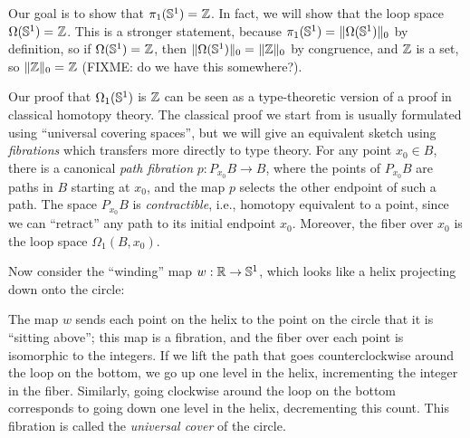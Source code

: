 Our goal is to show that $\id {\pi_1(\Sn ^1)} {\Z}$.  In fact, we
will show that the loop space $\id {\Omega(\Sn ^1)} {\Z}$.  This is a stronger
statement, because $\id{\pi_1(\Sn ^1)} {\trunc 0 {\Omega(\Sn ^1)}}$ by
definition, so if $\id {\Omega(\Sn ^1)} {\Z}$, then $\id {\trunc
  0 {\Omega(\Sn ^1)}} {\trunc 0 {\Z}}$ by congruence, and
$\Z$ is a set, so $\id {\trunc 0 {\Z}} {\Z}$
(FIXME: do we have this somewhere?).  

Our proof that $\Omega_1(\Sn ^1)$ is $\Z$ can be seen as a
type-theoretic version of a proof in classical homotopy theory.  The
classical proof we start from is usually formulated using ``universal
covering spaces'', but we will give an equivalent sketch using
\emph{fibrations} which transfers more directly to type theory.  For any
point $x_0\in B$, there is a canonical \emph{path fibration} $p:P_{x_0}
B \to B$, where the points of $P_{x_0} B$ are paths in $B$ starting at
$x_0$, and the map $p$ selects the other endpoint of such a path.  The
space $P_{x_0} B$ is \emph{contractible}, i.e., homotopy equivalent to a
point, since we can ``retract'' any path to its initial endpoint $x_0$.
Moreover, the fiber over $x_0$ is the loop space $\Omega_1(B,x_0)$.

Now consider the ``winding'' map $w:\mathbb{R}\to \Sn ^1$, which
looks like a helix projecting down onto the circle:
\begin{center}
\end{center}
The map $w$ sends each point on the helix to the point on the circle
that it is ``sitting above''; this map is a fibration, and the fiber
over each point is isomorphic to the integers.  If we lift the path that
goes counterclockwise around the loop on the bottom, we go up one level in the
helix, incrementing the integer in the fiber.  Similarly, going
clockwise around the loop on the bottom corresponds to going down
one level in the helix, decrementing this count.  This fibration is
called the \emph{universal cover} of the circle.

